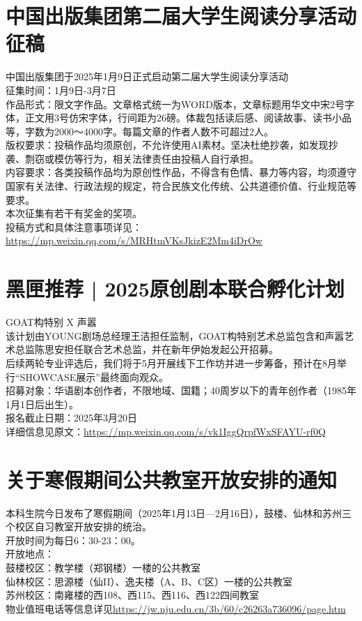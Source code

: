 \documentclass[letterpaper, 12pt]{article}
\begin{document}
\begin{multicols}{2}
\section{中国出版集团第二届大学生阅读分享活动征稿}
中国出版集团于2025年1月9日正式启动第二届大学生阅读分享活动\\
征集时间：1月9日-3月7日\\
作品形式：限文字作品。文章格式统一为WORD版本，文章标题用华文中宋2号字体，正文用3号仿宋字体，行间距为26磅。体裁包括读后感、阅读故事、读书小品等，字数为2000～4000字。每篇文章的作者人数不可超过2人。\\
版权要求：投稿作品均须原创，不允许使用AI素材。坚决杜绝抄袭，如发现抄袭、剽窃或模仿等行为，相关法律责任由投稿人自行承担。\\
内容要求：各类投稿作品均为原创性作品，不得含有色情、暴力等内容，均须遵守国家有关法律、行政法规的规定，符合民族文化传统、公共道德价值、行业规范等要求。\\
本次征集有若干有奖金的奖项。\\
投稿方式和具体注意事项详见：\url{https://mp.weixin.qq.com/s/MRHtmVKsJkizE2Mm4iDrOw}
\section{黑匣推荐 | 2025原创剧本联合孵化计划}
GOAT构特别 X 声嚣\\
该计划由YOUNG剧场总经理王洁担任监制，GOAT构特别艺术总监包含和声嚣艺术总监陈思安担任联合艺术总监，并在新年伊始发起公开招募。\\
后续两轮专业评选后，我们将于5月开展线下工作坊并进一步筹备，预计在8月举行“SHOWCASE展示”最终面向观众。\\
招募对象：华语剧本创作者，不限地域、国籍；40周岁以下的青年创作者（1985年1月1日后出生）。\\
报名截止日期：2025年3月20日\\
详细信息见原文：\url{https://mp.weixin.qq.com/s/vk1IggQrpfWxSFAYU-rf0Q}

\section{关于寒假期间公共教室开放安排的通知}
本科生院今日发布了寒假期间（2025年1月13日—2月16日），鼓楼、仙林和苏州三个校区自习教室开放安排的统治。\\
开放时间为每日6：30-23：00。\\
开放地点：\\
鼓楼校区：教学楼（郑钢楼）一楼的公共教室\\
仙林校区：思源楼（仙II）、逸夫楼（A、B、C区）一楼的公共教室\\
苏州校区：南雍楼的西108、西115、西116、西122四间教室\\
物业值班电话等信息详见\url{https://jw.nju.edu.cn/3b/60/c26263a736096/page.htm}


\end{multicols}
\end{document}
